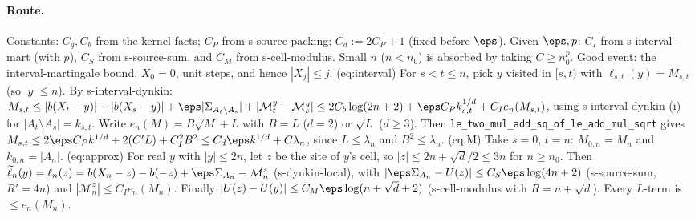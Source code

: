 \paragraph{Route.} Constants: $C_g,C_b$ from the kernel facts; $C_P$ from s-source-packing; $C_d:=2C_P+1$ (fixed before $\eps$). Given $\eps,p$: $C_I$ from
s-interval-mart (with $p$), $C_S$ from s-source-sum, and $C_M$ from s-cell-modulus. Small $n$ ($n<n_0$) is absorbed by taking $C\geq n_0^p$. Good event: the
interval-martingale bound, $X_0=0$, unit steps, and hence $|X_j|\leq j$.
(eq:interval) For $s<t\leq n$, pick $y$ visited in $[s,t)$ with $\ell_{s,t}(y)=M_{s,t}$ (so $|y|\leq n$). By s-interval-dynkin:
$M_{s,t}\leq|b(X_t-y)|+|b(X_s-y)|+\eps|\Sigma_{A_t\setminus A_s}|+|\mathcal M^y_t-\mathcal M^y_s|\leq2C_b\log(2n+2)+\eps C_Pk_{s,t}^{1/d}+C_Ie_n(M_{s,t})$,
using s-interval-dynkin (i) for $|A_t\setminus A_s|=k_{s,t}$. Write $e_n(M)=B\sqrt M+L$ with $B=L$ ($d=2$) or $\sqrt L$ ($d\geq3$). Then
\texttt{le\_two\_mul\_add\_sq\_of\_le\_add\_mul\_sqrt} gives $M_{s,t}\leq2\eps C_Pk^{1/d}+2(C'L)+C_I^2B^2\leq C_d\eps k^{1/d}+C\lambda_n$, since $L\leq\lambda_n$
and $B^2\leq\lambda_n$. (eq:M) Take $s=0$, $t=n$: $M_{0,n}=M_n$ and $k_{0,n}=|A_n|$.
(eq:approx) For real $y$ with $|y|\leq2n$, let $z$ be the site of $y$'s cell, so $|z|\leq2n+\sqrt d/2\leq3n$ for $n\geq n_0$. Then
$\widetilde\ell_n(y)=\ell_n(z)=b(X_n-z)-b(-z)+\eps\Sigma_{A_n}-\mathcal M^z_n$ (s-dynkin-local), with $|\eps\Sigma_{A_n}-U(z)|\leq C_S\eps\log(4n+2)$
(s-source-sum, $R'=4n$) and $|\mathcal M^z_n|\leq C_Ie_n(M_n)$. Finally $|U(z)-U(y)|\leq C_M\eps\log(n+\sqrt d+2)$ (s-cell-modulus with $R=n+\sqrt d$).
Every $L$-term is $\leq e_n(M_n)$.
